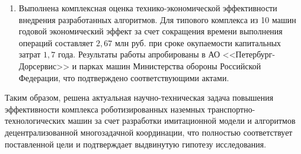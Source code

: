 \begin{enumerate}[beginpenalty=10000, midpenalty=10000, wide=\parindent, leftmargin=0pt]
    Согласно актам внедрения, применение разработанных алгоритмов обеспечило:
    \begin{itemize}[beginpenalty=10000, midpenalty=10000, wide=\parindent, leftmargin=0pt]
        \item рост производительности комплекса РНТТМ на $ 11{,}2 $-$ 13{,}1\,\% $;
        \item сокращение общего времени выполнения операций на $ 8{,}7 $-$ 9{,}1\,\% $;
        \item повышение энергоэффективности (снижение удельных энергозатрат) на $ 11{,}8 $-$ 12{,}3\,\% $;
        \item уменьшение времени простоев оборудования на $ 8{,}2 $-$ 9{,}1\,\% $.
    \end{itemize}

    \item Выполнена комплексная оценка технико-экономической эффективности внедрения разработанных алгоритмов. Для типового комплекса из 10 машин годовой экономический эффект за счет сокращения времени выполнения операций составляет $ 2{,}67 $ млн руб. при сроке окупаемости капитальных затрат $ 1{,}7 $ года. Результаты работы апробированы в АО <<Петербург-Дорсервис>> и парках машин Министерства обороны Российской Федерации, что подтверждено соответствующими актами.
\end{enumerate}

Таким образом, решена актуальная научно-техническая задача повышения эффективности комплекса роботизированных наземных транспортно-технологических машин за счет разработки имитационной модели и алгоритмов децентрализованной многозадачной координации, что полностью соответствует поставленной цели и подтверждает выдвинутую гипотезу исследования.
